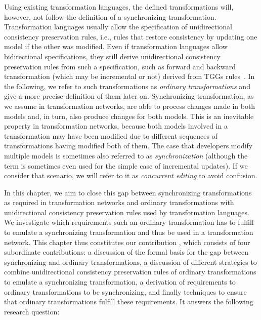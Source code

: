 Using existing transformation languages, the defined transformations will, however, not follow the definition of a synchronizing transformation.
Transformation languages usually allow the specification of unidirectional consistency preservation rules, i.e., rules that restore consistency by updating one model if the other was modified.
Even if transformation languages allow bidirectional specifications, they still derive unidirectional consistency preservation rules from such a specification, such as forward and backward transformation (which may be incremental or not) derived from \glspl{TGG} rules~\cite{leblebici2014IncrementalTGGSurvey-GTVMT}.
In the following, we refer to such transformations as \emph{ordinary transformations} and give a more precise definition of them later on.
Synchronizing transformation, as we assume in transformation networks, are able to process changes made in both models and, in turn, also produce changes for both models.
This is an inevitable property in transformation networks, because both models involved in a transformation may have been modified due to different sequences of transformations having modified both of them.
The case that developers modify multiple models is sometimes also referred to as \emph{synchronization} (although the term is sometimes even used for the simple case of incremental updates).
If we consider that scenario, we will refer to it as \emph{concurrent editing} to avoid confusion.

In this chapter, we aim to close this gap between synchronizing transformations as required in transformation networks and ordinary transformations with unidirectional consistency preservation rules used by transformation languages.
We investigate which requirements such an ordinary transformation has to fulfill to emulate a synchronizing transformation and thus be used in a transformation network.
This chapter thus constitutes our contribution , which consists of four subordinate contributions: a discussion of the formal basis for the gap between synchronizing and ordinary transformations, a discussion of different strategies to combine unidirectional consistency preservation rules of ordinary transformations to emulate a synchronizing transformation, a derivation of requirements to ordinary transformations to be synchronizing, and finally techniques to ensure that ordinary transformations fulfill these requirements.
It answers the following research question:

